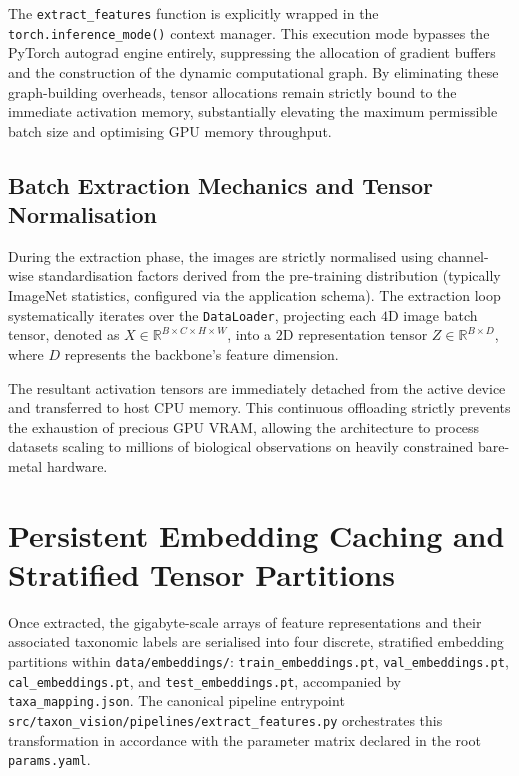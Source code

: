 The \texttt{extract\_features} function is explicitly wrapped in the \texttt{torch.inference\_mode()} context manager. This execution mode bypasses the PyTorch autograd engine entirely, suppressing the allocation of gradient buffers and the construction of the dynamic computational graph. By eliminating these graph-building overheads, tensor allocations remain strictly bound to the immediate activation memory, substantially elevating the maximum permissible batch size and optimising GPU memory throughput.

\subsection{Batch Extraction Mechanics and Tensor Normalisation}

During the extraction phase, the images are strictly normalised using channel-wise standardisation factors derived from the pre-training distribution (typically ImageNet statistics, configured via the application schema). The extraction loop systematically iterates over the \texttt{DataLoader}, projecting each $4\text{D}$ image batch tensor, denoted as $X \in \mathbb{R}^{B \times C \times H \times W}$, into a $2\text{D}$ representation tensor $Z \in \mathbb{R}^{B \times D}$, where $D$ represents the backbone's feature dimension.

The resultant activation tensors are immediately detached from the active device and transferred to host CPU memory. This continuous offloading strictly prevents the exhaustion of precious GPU VRAM, allowing the architecture to process datasets scaling to millions of biological observations on heavily constrained bare-metal hardware.

\section{Persistent Embedding Caching and Stratified Tensor Partitions}
\label{sec:persistent_embedding_caching}

Once extracted, the gigabyte-scale arrays of feature representations and their associated taxonomic labels are serialised into four discrete, stratified embedding partitions within \texttt{data/embeddings/}: \texttt{train\_embeddings.pt}, \texttt{val\_embeddings.pt}, \texttt{cal\_embeddings.pt}, and \texttt{test\_embeddings.pt}, accompanied by \texttt{taxa\_mapping.json}. The canonical pipeline entrypoint \texttt{src/taxon\_vision/pipelines/extract\_features.py} orchestrates this transformation in accordance with the parameter matrix declared in the root \texttt{params.yaml}.

